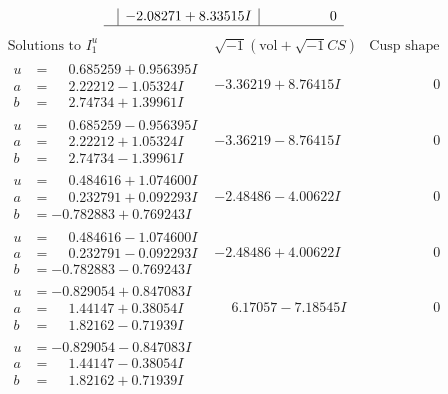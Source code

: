 \documentclass[1p]{elsarticle_modified}
\theoremstyle{definition}
\newcommand{\I}{\sqrt{-1}}
\begin{document}
$$\begin{array}{c|c|c}
 & -2.08271 + 8.33515 I & \phantom{-0.000000 } 0\\
 \hline 
 \end{array}$$\newpage$$\begin{array}{c|c|c}  
\text{Solutions to }I^u_{1}& \I (\text{vol} + \sqrt{-1}CS) & \text{Cusp shape}\\
 \hline 
\begin{aligned}
u &= \phantom{-}0.685259 + 0.956395 I \\
a &= \phantom{-}2.22212 - 1.05324 I \\
b &= \phantom{-}2.74734 + 1.39961 I\end{aligned}
 & -3.36219 + 8.76415 I & \phantom{-0.000000 } 0 \\ \hline\begin{aligned}
u &= \phantom{-}0.685259 - 0.956395 I \\
a &= \phantom{-}2.22212 + 1.05324 I \\
b &= \phantom{-}2.74734 - 1.39961 I\end{aligned}
 & -3.36219 - 8.76415 I & \phantom{-0.000000 } 0 \\ \hline\begin{aligned}
u &= \phantom{-}0.484616 + 1.074600 I \\
a &= \phantom{-}0.232791 + 0.092293 I \\
b &= -0.782883 + 0.769243 I\end{aligned}
 & -2.48486 - 4.00622 I & \phantom{-0.000000 } 0 \\ \hline\begin{aligned}
u &= \phantom{-}0.484616 - 1.074600 I \\
a &= \phantom{-}0.232791 - 0.092293 I \\
b &= -0.782883 - 0.769243 I\end{aligned}
 & -2.48486 + 4.00622 I & \phantom{-0.000000 } 0 \\ \hline\begin{aligned}
u &= -0.829054 + 0.847083 I \\
a &= \phantom{-}1.44147 + 0.38054 I \\
b &= \phantom{-}1.82162 - 0.71939 I\end{aligned}
 & \phantom{-}6.17057 - 7.18545 I & \phantom{-0.000000 } 0 \\ \hline\begin{aligned}
u &= -0.829054 - 0.847083 I \\
a &= \phantom{-}1.44147 - 0.38054 I \\
b &= \phantom{-}1.82162 + 0.71939 I\end{aligned}

\end{array}$$
\end{document}
